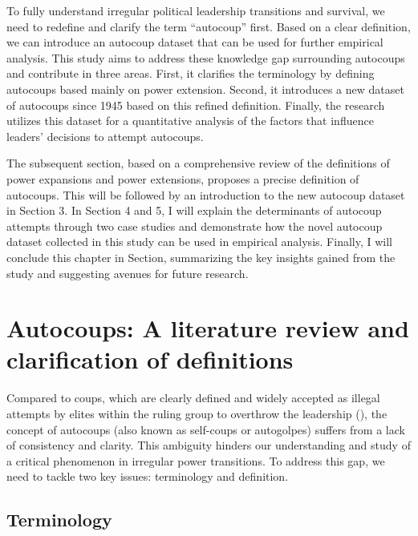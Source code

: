 \documentclass[
  12pt,
]{report}
\begin{document}
To fully understand irregular political leadership transitions and
survival, we need to redefine and clarify the term ``autocoup'' first.
Based on a clear definition, we can introduce an autocoup dataset that
can be used for further empirical analysis. This study aims to address
these knowledge gap surrounding autocoups and contribute in three areas.
First, it clarifies the terminology by defining autocoups based mainly
on power extension. Second, it introduces a new dataset of autocoups
since 1945 based on this refined definition. Finally, the research
utilizes this dataset for a quantitative analysis of the factors that
influence leaders' decisions to attempt autocoups.

The subsequent section, based on a comprehensive review of the
definitions of power expansions and power extensions, proposes a precise
definition of autocoups. This will be followed by an introduction to the
new autocoup dataset in Section 3. In Section 4 and 5, I will explain
the determinants of autocoup attempts through two case studies and
demonstrate how the novel autocoup dataset collected in this study can
be used in empirical analysis. Finally, I will conclude this chapter in
Section, summarizing the key insights gained from the study and
suggesting avenues for future research.

\section{Autocoups: A literature review and clarification of
definitions}\label{autocoups-a-literature-review-and-clarification-of-definitions}

Compared to coups, which are clearly defined and widely accepted as
illegal attempts by elites within the ruling group to overthrow the
leadership (), the
concept of autocoups (also known as self-coups or autogolpes) suffers
from a lack of consistency and clarity. This ambiguity hinders our
understanding and study of a critical phenomenon in irregular power
transitions. To address this gap, we need to tackle two key issues:
terminology and definition.

\subsection{Terminology}\label{terminology}
\end{document}
